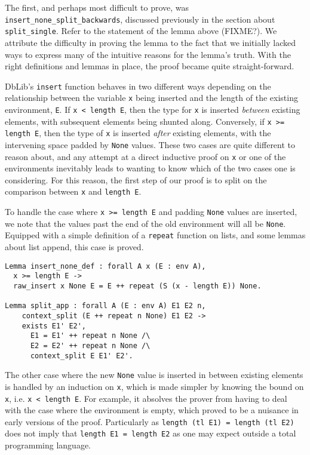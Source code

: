 \documentclass[]{unswthesis}
\let\c\texttt
\let\i\textit
\begin{document}
The first, and perhaps most difficult to prove, was \c{insert_none_split_backwards}, discussed previously in the section about \c{split_single}. Refer to the statement of the lemma above (FIXME?). We attribute the difficulty in proving the lemma to the fact that we initially lacked ways to express many of the intuitive reasons for the lemma's truth. With the right definitions and lemmas in place, the proof became quite straight-forward.

DbLib's \c{insert} function behaves in two different ways depending on the relationship between the variable \c{x} being inserted and the length of the existing environment, \c{E}. If \c{x < length E}, then the type for \c{x} is inserted \i{between} existing elements, with subsequent elements being shunted along. Conversely, if \c{x >= length E}, then the type of \c{x} is inserted \i{after} existing elements, with the intervening space padded by \c{None} values. These two cases are quite different to reason about, and any attempt at a direct inductive proof on \c{x} or one of the environments inevitably leads to wanting to know which of the two cases one is considering. For this reason, the first step of our proof is to split on the comparison between \c{x} and \c{length E}.

To handle the case where \c{x >= length E} and padding \c{None} values are inserted, we note that the values past the end of the old environment will all be \c{None}. Equipped with a simple definition of a \c{repeat} function on lists, and some lemmas about list append, this case is proved.

\begin{verbatim}
Lemma insert_none_def : forall A x (E : env A),
  x >= length E ->
  raw_insert x None E = E ++ repeat (S (x - length E)) None.

Lemma split_app : forall A (E : env A) E1 E2 n,
    context_split (E ++ repeat n None) E1 E2 ->
    exists E1' E2',
      E1 = E1' ++ repeat n None /\
      E2 = E2' ++ repeat n None /\
      context_split E E1' E2'.
\end{verbatim}

The other case where the new \c{None} value is inserted in between existing elements is handled by an induction on \c{x}, which is made simpler by knowing the bound on \c{x}, i.e. \c{x < length E}. For example, it absolves the prover from having to deal with the case where the environment is empty, which proved to be a nuisance in early versions of the proof. Particularly as \c{length (tl E1) = length (tl E2)} does not imply that \c{length E1 = length E2} as one may expect outside a total programming language.
\end{document}
